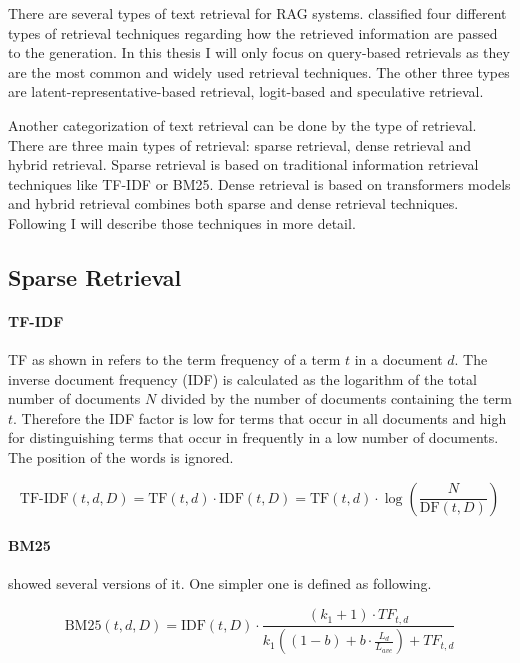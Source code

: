 
There are several types of text retrieval for RAG systems. \cite{Zhao.29.02.2024} classified four different types of retrieval techniques regarding how the retrieved information are passed to the generation. In this thesis I will only focus on query-based retrievals as they are the most common and widely used retrieval techniques. The other three types are latent-representative-based retrieval, logit-based and speculative retrieval.

Another categorization of text retrieval can be done by the type of retrieval. There are three main types of retrieval: sparse retrieval, dense retrieval and hybrid retrieval. Sparse retrieval is based on traditional information retrieval techniques like TF-IDF or BM25. Dense retrieval is based on transformers models and hybrid retrieval combines both sparse and dense retrieval techniques. Following I  will describe those techniques in more detail.
\subsection{Sparse Retrieval}
\label{sec:sparse_retrieval}

\paragraph{TF-IDF}
\label{sec:tfidf}

TF as shown in \cite{Manning.2009} refers to the term frequency of a term $t$ in a document $d$. The inverse document frequency (IDF) is calculated as the logarithm of the total number of documents $N$ divided by the number of documents containing the term $t$. Therefore the IDF factor is low for terms that occur in all documents and high for distinguishing terms that occur in frequently in a low number of documents. The position of the words is ignored.

\begin{equation}
    \text{TF-IDF}(t, d, D) = \text{TF}(t, d) \cdot \text{IDF}(t, D) = \text{TF}(t, d) \cdot \log\left(\frac{N}{\text{DF}(t, D)}\right)
\end{equation}


\paragraph{BM25}
\label{sec:bm25}

\cite{Manning.2009} showed several versions of it. One simpler one is defined as following.

\begin{equation}
    \text{BM25}(t, d, D) = \text{IDF}(t, D) \cdot \frac{(k_1 + 1) \cdot TF_{t, d}}{k_1((1-b)+b \cdot \frac{L_d}{L_{ave}}) + TF_{t, d}}
\end{equation}

